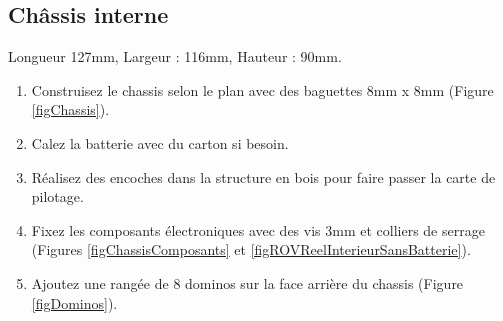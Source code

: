 \documentclass[11pt,a4paper]{article}
\begin{document}
      
      \subsection{Châssis interne}
        Longueur 127mm, Largeur : 116mm, Hauteur : 90mm.
        \begin{enumerate}
          \item Construisez le chassis selon le plan avec des baguettes 8mm x 8mm (Figure \ref{figChassis}).

          \item Calez la batterie avec du carton si besoin.
          
          \item Réalisez des encoches dans la structure en bois pour faire passer la carte de pilotage.
          
          \item Fixez les composants électroniques avec des vis 3mm et colliers de serrage (Figures \ref{figChassisComposants} et \ref{figROVReelInterieurSansBatterie}).
          
          \item Ajoutez une rangée de 8 dominos sur la face arrière du chassis (Figure \ref{figDominos}).
        \end{enumerate}
        
\end{document}
